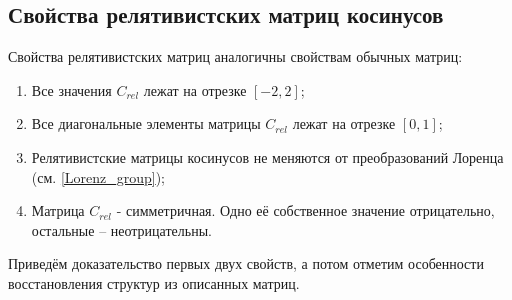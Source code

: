 \subsection{Свойства релятивистских матриц косинусов}
Свойства релятивистских матриц аналогичны свойствам обычных матриц:
\begin{enumerate}
\item Все значения $C_{rel}$ лежат на отрезке $[-2, 2]$;
\item Все диагональные элементы матрицы $C_{rel}$ лежат на отрезке $[0, 1]$;
\item Релятивистские матрицы косинусов не меняются от преобразований Лоренца (см. \ref{Lorenz_group});
\item Матрица $C_{rel}$ - симметричная. Одно её собственное значение отрицательно, остальные -- неотрицательны.
\end{enumerate}
Приведём доказательство первых двух свойств, а потом отметим особенности восстановления структур из описанных матриц.

